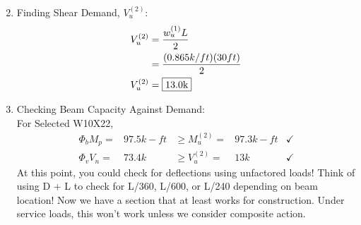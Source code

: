 \documentclass{report} %
\begin{document}
\begin{enumerate}
\begin{equation*}
        \end{equation*}
    \item Finding Shear Demand, $V^{(2)}_u$:
        \begin{equation*}
            \begin{aligned}
                V^{(2)}_u   &= \frac{{w^{(1)}_u}L}{2} \\
                            &= \frac{(0.865k/ft)(30ft)}{2} \\
                V^{(2)}_u   &= \framebox{13.0k}
            \end{aligned}
        \end{equation*}
    \item Checking Beam Capacity Against Demand: \\
    For Selected W10X22,
        \begin{equation*}
            \begin{aligned}
                \Phi _b M_p = &97.5k-ft &\geq M^{(2)}_u = &97.3k-ft &\checkmark\\
                \Phi _v V_n = &73.4k &\geq V^{(2)}_u = &13k &\checkmark
            \end{aligned}
        \end{equation*}
    At this point, you could check for deflections using unfactored loads! Think of using D + L to check for L/360, L/600, or L/240 depending on beam location! 
    \newline
    Now we have a section that at least works for construction. Under service loads, this won't work unless we consider composite action.
\end{enumerate}
\end{document}
